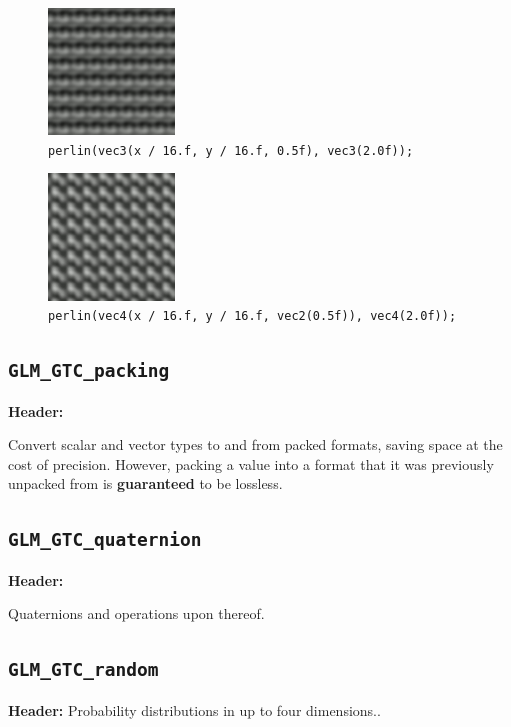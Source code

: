 \documentclass{scrartcl}
\numberwithin{figure}{subsection}
\begin{document}
\begin{figure}
  \centering
  \includegraphics[width=0.3\textwidth]{perlin5}
  \cprotect\caption{\verb|perlin(vec3(x / 16.f, y / 16.f, 0.5f), vec3(2.0f));|}
\end{figure}

\begin{figure}
  \centering
  \includegraphics[width=0.3\textwidth]{perlin6}
  \cprotect\caption{\verb|perlin(vec4(x / 16.f, y / 16.f, vec2(0.5f)), vec4(2.0f));|}
\end{figure}

\subsection{\texttt{GLM\_GTC\_packing}}
\textbf{Header:} 

Convert scalar and vector types to and from packed formats, saving space at the cost of precision. However, packing a value into a format that it was previously unpacked from is \textbf{guaranteed} to be lossless.

\subsection{\texttt{GLM\_GTC\_quaternion}}
\textbf{Header:} 

Quaternions and operations upon thereof.

\subsection{\texttt{GLM\_GTC\_random}}
\textbf{Header:} 
Probability distributions in up to four dimensions..
\end{document}
